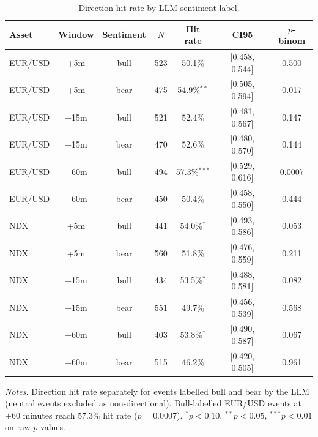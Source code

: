 \begin{table}[!htbp]
\centering
\caption{Direction hit rate by LLM sentiment label.}
\label{tab:subsample-direction}
\begin{threeparttable}
\small
\begin{tabular}{lcccccc}
\toprule
Asset & Window & Sentiment & $N$ & Hit rate & CI95 & $p$-binom \\
\midrule
EUR/USD & +5m & bull & 523 & 50.1\% & [0.458, 0.544] & 0.500 \\
EUR/USD & +5m & bear & 475 & 54.9\%$^{**}$ & [0.505, 0.594] & 0.017 \\
EUR/USD & +15m & bull & 521 & 52.4\% & [0.481, 0.567] & 0.147 \\
EUR/USD & +15m & bear & 470 & 52.6\% & [0.480, 0.570] & 0.144 \\
EUR/USD & +60m & bull & 494 & 57.3\%$^{***}$ & [0.529, 0.616] & 0.0007 \\
EUR/USD & +60m & bear & 450 & 50.4\% & [0.458, 0.550] & 0.444 \\
NDX & +5m & bull & 441 & 54.0\%$^{*}$ & [0.493, 0.586] & 0.053 \\
NDX & +5m & bear & 560 & 51.8\% & [0.476, 0.559] & 0.211 \\
NDX & +15m & bull & 434 & 53.5\%$^{*}$ & [0.488, 0.581] & 0.082 \\
NDX & +15m & bear & 551 & 49.7\% & [0.456, 0.539] & 0.568 \\
NDX & +60m & bull & 403 & 53.8\%$^{*}$ & [0.490, 0.587] & 0.067 \\
NDX & +60m & bear & 515 & 46.2\% & [0.420, 0.505] & 0.961 \\
\bottomrule
\end{tabular}
\begin{tablenotes}
\footnotesize
\item \textit{Notes.} Direction hit rate separately for events
labelled bull and bear by the LLM (neutral events excluded as
non-directional). Bull-labelled EUR/USD events at $+60$ minutes
reach $57.3\%$ hit rate ($p = 0.0007$). $^{*}p<0.10$, $^{**}p<0.05$,
$^{***}p<0.01$ on raw $p$-values.
\end{tablenotes}
\end{threeparttable}
\end{table}
